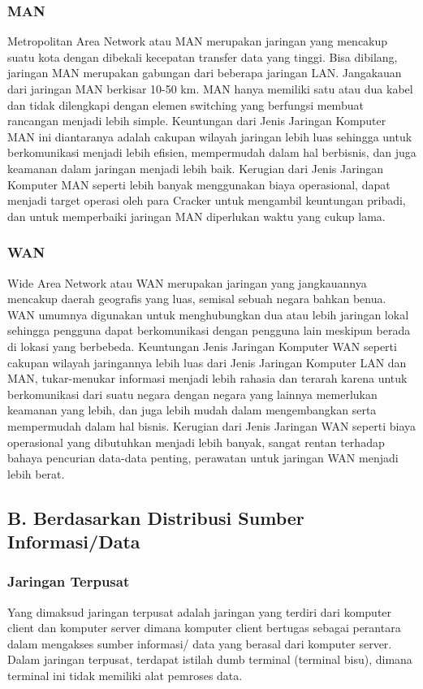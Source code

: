     \subsubsection{MAN}
      Metropolitan Area Network atau MAN merupakan jaringan yang mencakup suatu kota dengan dibekali kecepatan transfer data yang tinggi. Bisa dibilang, jaringan MAN merupakan gabungan dari beberapa jaringan LAN.
    Jangakauan dari jaringan MAN berkisar 10-50 km. MAN hanya memiliki satu atau dua kabel dan tidak dilengkapi dengan elemen switching yang berfungsi membuat rancangan menjadi lebih simple.
    Keuntungan dari Jenis Jaringan Komputer MAN ini diantaranya adalah cakupan wilayah jaringan lebih luas sehingga untuk berkomunikasi menjadi lebih efisien, mempermudah dalam hal berbisnis, dan juga keamanan dalam jaringan menjadi lebih baik.
    Kerugian dari Jenis Jaringan Komputer MAN seperti lebih banyak menggunakan biaya operasional, dapat menjadi target operasi oleh para Cracker untuk mengambil keuntungan pribadi, dan untuk memperbaiki jaringan MAN diperlukan waktu yang cukup lama.
    \subsubsection{WAN}
      Wide Area Network atau WAN merupakan jaringan yang jangkauannya mencakup daerah geografis yang luas, semisal sebuah negara bahkan benua. WAN umumnya digunakan untuk menghubungkan dua atau lebih jaringan lokal sehingga pengguna dapat berkomunikasi dengan pengguna lain meskipun berada di lokasi yang berbebeda.
    Keuntungan Jenis Jaringan Komputer WAN seperti cakupan wilayah jaringannya lebih luas dari Jenis Jaringan Komputer LAN dan MAN, tukar-menukar informasi menjadi lebih rahasia dan terarah karena untuk berkomunikasi dari suatu negara dengan negara yang lainnya memerlukan keamanan yang lebih, dan juga lebih mudah dalam mengembangkan serta mempermudah dalam hal bisnis.
    Kerugian dari Jenis Jaringan WAN seperti biaya operasional yang dibutuhkan menjadi lebih banyak, sangat rentan terhadap bahaya pencurian data-data penting, perawatan untuk jaringan WAN menjadi lebih berat.

\subsection{B. Berdasarkan Distribusi Sumber Informasi/Data}
  \subsubsection{Jaringan Terpusat}
  Yang dimaksud jaringan terpusat adalah jaringan yang terdiri dari komputer client dan komputer server dimana komputer client bertugas sebagai perantara dalam mengakses sumber informasi/ data yang berasal dari komputer server. Dalam jaringan terpusat, terdapat istilah dumb terminal (terminal bisu), dimana terminal ini tidak memiliki alat pemroses data.
